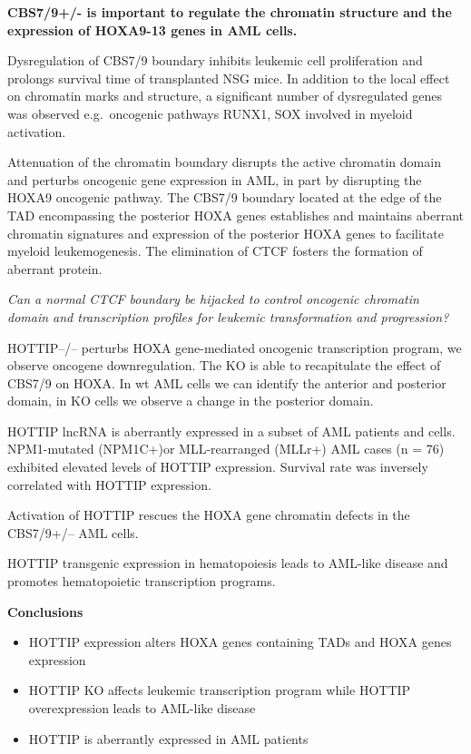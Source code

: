 \textbf{CBS7/9+/- is important to regulate the chromatin structure and the expression of HOXA9-13 genes in AML cells.}

Dysregulation of CBS7/9 boundary inhibits leukemic cell proliferation and prolongs survival time of transplanted NSG mice. In addition to the local effect on chromatin marks and structure, a significant number of dysregulated genes was observed e.g.~oncogenic pathways RUNX1, SOX involved in myeloid activation.

Attenuation of the chromatin boundary disrupts the active chromatin domain and perturbs oncogenic gene expression in AML, in part by disrupting the HOXA9 oncogenic pathway. The CBS7/9 boundary located at the edge of the TAD encompassing the posterior HOXA genes establishes and maintains aberrant chromatin signatures and expression of the posterior HOXA genes to facilitate myeloid leukemogenesis. The elimination of CTCF fosters the formation of aberrant protein.

\emph{Can a normal CTCF boundary be hijacked to control oncogenic chromatin domain and transcription profiles for leukemic transformation and progression?}

HOTTIP--/-- perturbs HOXA gene-mediated oncogenic transcription program, we observe oncogene downregulation. The KO is able to recapitulate the effect of CBS7/9 on HOXA. In wt AML cells we can identify the anterior and posterior domain, in KO cells we observe a change in the posterior domain.

HOTTIP lncRNA is aberrantly expressed in a subset of AML patients and cells. NPM1-mutated (NPM1C+)or MLL-rearranged (MLLr+) AML cases (n = 76) exhibited elevated levels of HOTTIP expression. Survival rate was inversely correlated with HOTTIP expression.

Activation of HOTTIP rescues the HOXA gene chromatin defects in the CBS7/9+/-- AML cells.

HOTTIP transgenic expression in hematopoiesis leads to AML-like disease and promotes hematopoietic transcription programs.

\textbf{Conclusions}
\begin{itemize}
\tightlist
\item
  HOTTIP expression alters HOXA genes containing TADs and HOXA genes expression
\item
  HOTTIP KO affects leukemic transcription program while HOTTIP overexpression leads to AML-like disease
\item
  HOTTIP is aberrantly expressed in AML patients
\end{itemize}

